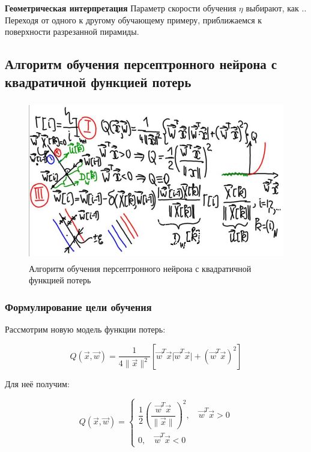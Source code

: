 \documentclass{article}
\numberwithin{equation}{subsection}
\begin{document}
\textbf{Геометрическая интерпретация}
Параметр скорости обучения $\eta$ выбирают, как .. 
Переходя от одного к другому обучающему примеру, приближаемся к поверхности разрезанной 
пирамиды.

\subsection{Алгоритм обучения персептронного нейрона с квадратичной функцией потерь}

\begin{figure}[htbp]
    \centering
    \includegraphics[height=7cm]{hyperflat_8_1.jpeg}
    \caption{Алгоритм обучения персептронного нейрона с квадратичной функцией потерь}
    \label{hyperflat_8_1}
\end{figure}





\subsubsection{Формулирование цели обучения}

Рассмотрим новую модель функции потерь:

\begin{equation}
    Q\left( \vec{x}, \vec{w} \right) = \dfrac{1}{4 \| \vec{x} \| ^2 } 
    \left[
        \vec{w}^T \vec{x} \lvert \vec{w}^T \vec{x} \rvert +
        \left( \vec{w}^T \vec{x} \right)^2
    \right]
\end{equation}

Для неё получим:

\begin{equation}
    Q\left( \vec{x}, \vec{w} \right) =
    \begin{cases}
        \dfrac{1}{2} \left( \dfrac{\vec{w}^T \vec{x}}{\| \vec{x} \|} \right) ^2, 
        \quad \vec{w}^T \vec{x} > 0\\
        0, \quad \vec{w}^T \vec{x} < 0
    \end{cases}
\end{equation}
\end{document}
